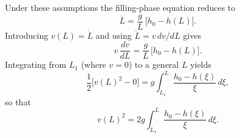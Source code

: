 \documentclass[11pt]{article}
\begin{document}
Under these assumptions the filling-phase equation reduces to
\begin{equation}
  \ddot L = \frac{g}{L}\,\bigl[h_0 - h(L)\bigr].
  \label{eq:ideal-ddotL}
\end{equation}
Introducing $v(L) = \dot L$ and using $\ddot L = v\,dv/dL$ gives
\begin{equation}
  v\,\frac{dv}{dL}
  = \frac{g}{L}\,\bigl[h_0 - h(L)\bigr].
  \label{eq:ideal-vdv}
\end{equation}
Integrating from $L_1$ (where $v=0$) to a general $L$ yields
\begin{equation}
  \frac{1}{2}\bigl[v(L)^2 - 0\bigr]
  = g\int_{L_1}^{L} \frac{h_0 - h(\xi)}{\xi}\,d\xi,
  \label{eq:ideal-int}
\end{equation}
so that
\begin{equation}
  v(L)^2
  = 2g\int_{L_1}^{L} \frac{h_0 - h(\xi)}{\xi}\,d\xi.
  \label{eq:ideal-v2}
\end{equation}
\end{document}
